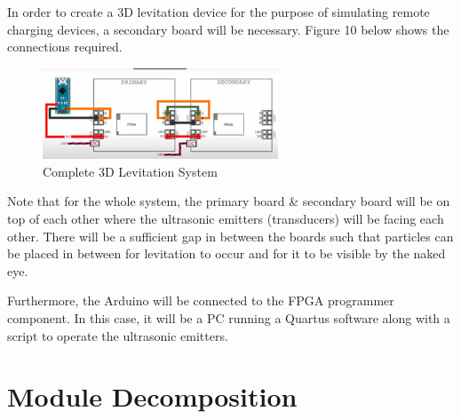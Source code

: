 \documentclass[12pt, titlepage]{article}
\begin{document}
In order to create a 3D levitation device for the purpose of simulating remote charging devices, a secondary board will be necessary. Figure 10 below shows the connections required.
\par 
\begin{figure}[htp]
  \centering
  \includegraphics[width=7cm]{images/Figure10.png}
  \caption[Hardware Complete]{Complete 3D Levitation System}
  \label{fig:figure10}
\end{figure}

Note that for the whole system, the primary board \& secondary board will be on top of each other where the ultrasonic emitters (transducers) will be facing each other. There will be a sufficient gap in between the boards such that particles can be placed in between for levitation to occur and for it to be visible by the naked eye.
\par
Furthermore, the Arduino will be connected to the FPGA programmer component. In this case, it will be a PC running a Quartus software along with a script to operate the ultrasonic emitters.
\par
\section{Module Decomposition}
\end{document}
